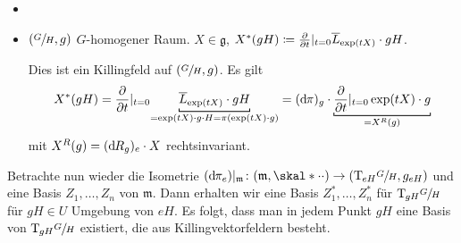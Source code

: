 \begin{beispiel*}
	\begin{itemize}
		\item {}
		\item $\enbrace*{\sfrac{G}{H},g}$ $G$-homogener Raum. $X \in \mathfrak{g}$, $X^*(g H) \coloneqq \diff{}{t}|_{t=0} \overline{L}_{\exp(tX)} \cdot gH$.
		
		Dies ist ein Killingfeld auf $(\sfrac{G}{H},g)$.
		Es gilt 
		\[
			X^*(gH) = \diff{}{t}|_{t=0} \Underbracket{\overline{L}_{\exp(tX)} \cdot gH}{= \exp(t X) \cdot g \cdot H = \pi \enbrace*{\exp(tX) \cdot g}} = (\mathd \pi)_g \cdot \Underbracket{\diff{}{t}|_{t=0} \exp(tX) \cdot g }{= X^R(g)}
		\]
		mit $X^R(g) = (\mathd R_g)_e \cdot X$ rechtsinvariant.
	\end{itemize}
\end{beispiel*}

Betrachte nun wieder die Isometrie $(\mathd \pi_e)|_\mathfrak{m} \colon (\mathfrak{m},\skal*{\cdot }{\cdot }) \to \enbrace*{\Tmap_{eH} \sfrac{G}{H},g_{eH}}$  und eine Basis $Z_1, \ldots ,Z_n$ von $\mathfrak{m}$.
Dann erhalten wir eine Basis $Z_1^*, \ldots , Z_n^*$ für $\Tmap_{gH} \sfrac{G}{H}$ für $gH \in U$ Umgebung von $eH$.
Es folgt, dass man in jedem Punkt $g H$ eine Basis  von $\Tmap_{gH} \sfrac{G}{H}$ existiert, die aus Killingvektorfeldern besteht.


